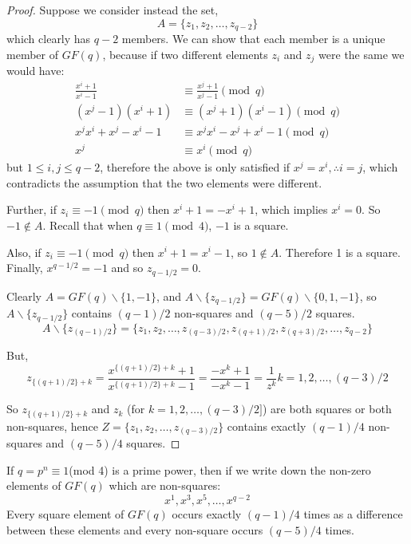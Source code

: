 \begin{proof}
Suppose we consider instead the set,
\begin{equation}
  A = \{z_1, z_2, \ldots, z_{q - 2}\}
\end{equation}
which clearly has $q - 2$ members.
We can show that each member is a unique member of $GF(q)$, because if two different elements $z_i$ and $z_j$ were the same we would have:
\begin{align}
\frac{x^i + 1}{x^i - 1} &\equiv \frac{x^j + 1}{x^j - 1}\pmod q \\
         (x^j-1)(x^i+1) &\equiv (x^j+1)(x^i-1)\pmod q \\
       x^jx^i+x^j-x^i-1 &\equiv x^jx^i - x^j + x^i -1\pmod q \\
                    x^j &\equiv x^i\pmod q
\end{align}
but $1 \leq i, j \leq q - 2$, therefore the above is only satisfied if $x^j = x^i, \therefore i = j$, which contradicts the assumption that the two elements were different.

Further, if $z_i \equiv -1\pmod q$ then $x^i + 1 = -x^i + 1$, which implies $x^i = 0$.
So $-1 \notin A$.
Recall that when $q \equiv 1\pmod 4$, $-1$ is a square.

Also, if $z_i \equiv -1\pmod q$ then $x^i + 1 = x^i - 1$, so $1 \notin A$.
Therefore 1 is a square.
Finally, $x^{q - 1/2} = -1$ and so $z_{q - 1/2} = 0$.

Clearly $A = GF(q) \backslash \{1, -1\}$, and $A \backslash \{z_{q - 1/2}\} = GF(q) \backslash \{0, 1, -1\}$, so $A \backslash \{z_{q - 1/2}\}$ contains $(q - 1)/2$ non-squares and $(q - 5)/2$ squares.
\begin{equation}
A \backslash \{z_{(q - 1)/2}\} = \{z_1, z_2, \ldots, z_{(q - 3)/2}, z_{(q + 1)/2}, z_{(q + 3)/2}, \ldots, z_{q - 2}\}
\end{equation}

But,
\begin{equation}
z_{\{(q + 1)/2\} + k} = \frac{x^{\{(q + 1)/2\} + k} + 1}{x^{\{(q + 1)/2\} + k} - 1} = \frac{-x^k + 1}{-x^k - 1} = \frac{1}{z^k} k = 1, 2, \ldots, (q - 3)/2
\end{equation}

So $z_{\{(q + 1)/2\} + k}$ and $z_k$ (for $k = 1, 2, \ldots, (q - 3)/2]$) are both squares or both non-squares, hence $Z = \{z_1, z_2, \ldots, z_{(q - 3)/2}\}$ contains exactly $(q - 1)/4$ non-squares and $(q - 5)/4$ squares.
\end{proof}

\begin{corollary}
If $q = p^n \equiv 1$(mod 4) is a prime power, then if we write down the non-zero elements of $GF(q)$ which are non-squares:
\begin{equation}
x^1, x^3, x^5, \ldots, x^{q - 2}
\end{equation}
Every square element of $GF(q)$ occurs exactly $(q - 1)/4$ times as a difference between these elements and every non-square occurs $(q - 5)/4$ times.
\end{corollary}

